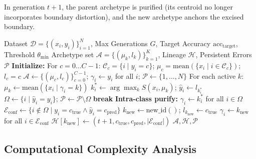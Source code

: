 \documentclass[11pt,a4paper]{article}
\begin{document}
In generation $t+1$, the parent archetype is purified (its centroid no longer incorporates boundary distortion), and the new archetype anchors the excised boundary.

\begin{algorithm}[t]
\caption{Purifying Archetype Classifier (PAC) Training}
\label{alg:pac}
\begin{algorithmic}[1]
\Require Dataset $\mathcal{D} = \{(x_i, y_i)\}_{i=1}^N$, Max Generations $G$, Target Accuracy $\text{acc}_{\text{target}}$, Threshold $\theta_{\text{min}}$
\Ensure Archetype set $\mathcal{A} = \{(\mu_k, l_k)\}_{k=1}^K$, Lineage $\mathcal{H}$, Persistent Errors $\mathcal{P}$
\State \textbf{Initialize:} For $c = 0 \dots C-1$: $\mathcal{C}_c = \{i \mid y_i = c\}$; $\mu_c = \text{mean}(\{x_i \mid i \in \mathcal{C}_c\})$; $l_c = c$
\State $\mathcal{A} \gets \{(\mu_c, l_c)\}_{c=0}^{C-1}$; $\gamma_i \gets y_i$ for all $i$; $\mathcal{P} \gets \{1, \dots, N\}$
    \State For each active $k$: $\mu_k \gets \text{mean}(\{x_i \mid \gamma_i = k\})$
        \State $k_i^* \gets \arg\max_{k} S(x_i, \mu_k)$; $\hat{y}_i \gets l_{k_i^*}$
    \EndFor
    \State $\Omega \gets \{i \mid \hat{y}_i = y_i\}$; $\mathcal{P} \gets \mathcal{P} \setminus \Omega$
     \textbf{break} \EndIf
    \State \textbf{Intra-class purify:} $\gamma_i \gets k_i^*$ for all $i \in \Omega$
        \State $\mathcal{E}_{\text{conf}} \gets \{i \notin \Omega \mid y_i = c_{\text{true}} \wedge \hat{y}_i = c_{\text{pred}}\}$
            \State $k_{\text{new}} \gets \text{new\_id}()$; $l_{k_{\text{new}}} \gets c_{\text{true}}$
            \State $\gamma_i \gets k_{\text{new}}$ for all $i \in \mathcal{E}_{\text{conf}}$
            \State $\mathcal{H}[k_{\text{new}}] \gets (t+1, c_{\text{true}}, c_{\text{pred}}, |\mathcal{E}_{\text{conf}}|)$
        \EndIf
    \EndFor
\EndFor
\State \Return $\mathcal{A}, \mathcal{H}, \mathcal{P}$
\end{algorithmic}
\end{algorithm}

\subsection{Computational Complexity Analysis}
\end{document}
